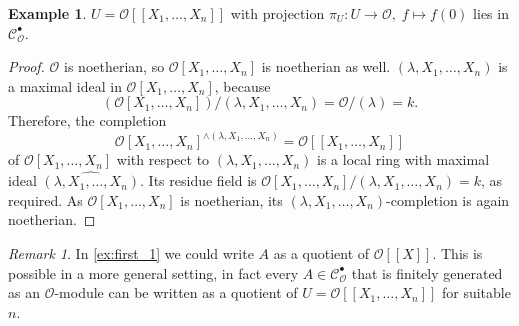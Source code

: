\documentclass{article}
\theoremstyle{plain}%
\theoremstyle{definition}
\newtheorem{example}[theorem]{Example}
\theoremstyle{remark}
\newtheorem{remark}[theorem]{Remark}
\newcommand{\cob}{\mathcal{C}_\mathcal{O}^\bullet}
\begin{document}
\begin{example}\label{ex:last_1}\cite[cf.][example 5]{Darmon1995}
    \(U = \mathcal{O}[[X_1, \dots, X_n]]\) with projection \(\pi_U\colon U \to \mathcal{O},\; f \mapsto f(0)\) lies in \(\cob\).
    \begin{proof}
        \(\mathcal{O}\) is noetherian, so \(\mathcal{O}[X_1, \dots, X_{n}]\) is noetherian as well.
        \((\lambda, X_1, \dots, X_n)\) is a maximal ideal in \(\mathcal{O}[X_1, \dots, X_n]\), because
        \[\left(\mathcal{O}[X_1, \dots, X_n]\right)/(\lambda, X_1, \dots, X_n) = \mathcal{O}/(\lambda) = k.\]
        Therefore, the completion \[\mathcal{O}[X_1, \dots, X_n]^{\wedge(\lambda, X_1, \dots, X_n)} = \mathcal{O}[[X_1, \dots, X_n]]\]
        of \(\mathcal{O}[X_1, \dots, X_n]\) with respect to \((\lambda, X_1, \dots, X_n)\) is a local ring with maximal ideal
        \(\widehat{(\lambda, X_1, \dots, X_n)}\).
        Its residue field is \(\mathcal{O}[X_1, \dots, X_n]/(\lambda, X_1, \dots, X_n) = k\), as required.
        As \(\mathcal{O}[X_1, \dots, X_n]\) is noetherian, its \((\lambda, X_1, \dots, X_n)\)-completion is again noetherian.
    \end{proof}
\end{example}

\begin{remark}\label{rem:quotientofU}
    In \cref{ex:first_1} we could write \(A\) as a quotient of \(\mathcal{O}[[X]]\). 
    This is possible in a more general setting, in fact every \(A \in \cob\) that is 
    finitely generated as an \(\mathcal{O}\)-module
    can be written as a quotient of
    \(U = \mathcal{O}[[X_1, \dots, X_n]]\) for suitable \(n\).
\end{remark}
\end{document}
